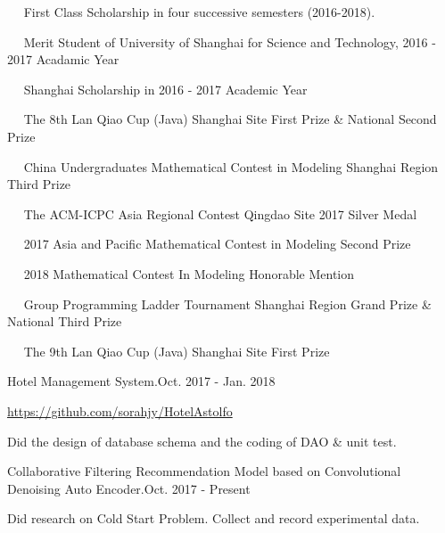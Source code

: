 \documentclass{sorahjy_cv}
\begin{document}
%
%

\begin{description}{}
	\item{\ \ } First Class Scholarship in four successive semesters (2016-2018).
	\item{\ \ } Merit Student of University of Shanghai for Science and Technology, 2016 - 2017 Acadamic Year
	\item{\ \ } Shanghai Scholarship in 2016 - 2017 Academic Year
	\item{\ \ } The 8th Lan Qiao Cup (Java) Shanghai Site {\color{orangeRed}First Prize} \& National {\color{orangeRed}Second Prize}
	\item{\ \ } China Undergraduates Mathematical Contest in Modeling Shanghai Region {\color{orangeRed}Third Prize}
	\item{\ \ } The ACM-ICPC Asia Regional Contest Qingdao Site 2017 {\color{orangeRed}Silver Medal}
	\item{\ \ } 2017 Asia and Pacific Mathematical Contest in Modeling {\color{orangeRed}Second Prize}
	\item{\ \ } 2018 Mathematical Contest In Modeling {\color{orangeRed}Honorable Mention}
	\item{\ \ } Group Programming Ladder Tournament Shanghai Region {\color{orangeRed}Grand Prize} \& National {\color{orangeRed}Third Prize}
	\item{\ \ } The 9th Lan Qiao Cup (Java) Shanghai Site {\color{orangeRed}First Prize}
\end{description}


%
%




\begin{sectionContentSimple}{Hotel Management System.}{Oct. 2017 - Jan. 2018}
	\item \url{https://github.com/sorahjy/HotelAstolfo}
	\item Did the design of database schema and the coding of DAO \& unit test.
\end{sectionContentSimple}

\begin{sectionContentSimple}{Collaborative Filtering Recommendation Model based on Convolutional Denoising Auto Encoder.}{Oct. 2017 - Present }
	\item Did research on Cold Start Problem. Collect and record experimental data.
\end{sectionContentSimple}
\end{document}
